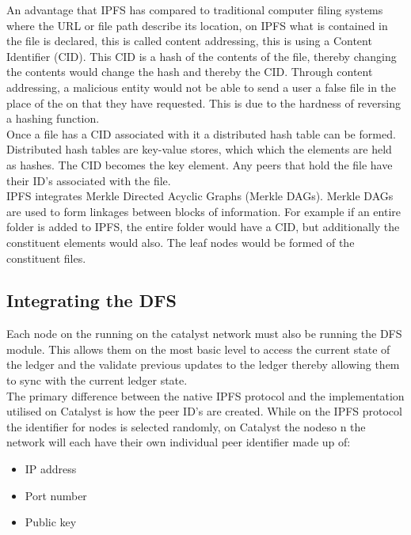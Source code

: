 \documentclass{article}
\begin{document}
An advantage that IPFS has compared to traditional computer filing systems where the URL or file path describe its location, on IPFS what is contained in the file is declared, this is called content addressing, this is using a Content Identifier (CID). This CID is a hash of the contents of the file, thereby changing the contents would change the hash and thereby the CID. Through content addressing, a malicious entity would not be able to send a user a false file in the place of the on that they have requested. This is due to the hardness of reversing a hashing function.\\

Once a file has a CID associated with it a distributed hash table can be formed. Distributed hash tables are key-value stores, which which the elements are held as hashes. The CID becomes the key element. Any peers that hold the file have their ID's associated with the file.  \\

IPFS integrates Merkle Directed Acyclic Graphs (Merkle DAGs). Merkle DAGs are used to form linkages between blocks of information. For example if an entire folder is added to IPFS, the entire folder would have a CID, but additionally the constituent elements would also. The leaf nodes would be formed of the constituent files. 


\subsection{Integrating the DFS}

Each node on the running on the catalyst network must also be running the DFS module. This allows them on the most basic level to access the current state of the ledger and the validate previous updates to the ledger thereby allowing them to sync with the current ledger state. \\

The primary difference between the native IPFS protocol and the implementation utilised on Catalyst is how the peer ID's are created.  While on the IPFS protocol the identifier for nodes is selected randomly, on Catalyst the nodeso n the network will each have their own individual peer identifier\cite{BytesExtentions} made up of:

\begin{itemize}
\item IP address
\item Port number
\item Public key
\end{itemize}
\end{document}
